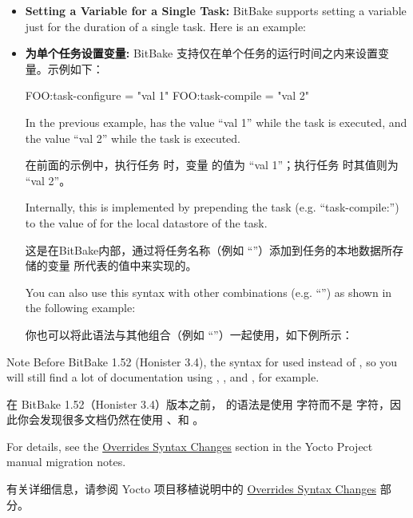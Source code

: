 \begin{itemize}
\item \textbf{Setting a Variable for a Single Task:} BitBake supports setting a variable just for the duration of a single task. Here is an example:
\item \textbf{为单个任务设置变量:} BitBake 支持仅在单个任务的运行时间之内来设置变量。示例如下：

\begin{pyglist}
FOO:task-configure = "val 1"
FOO:task-compile = "val 2"
\end{pyglist}

\medskip
In the previous example,  has the value ``val 1'' while the  task is executed, and the value ``val 2'' while the  task is executed.

\medskip
在前面的示例中，执行任务  时，变量  的值为 ``val 1''；执行任务  时其值则为 ``val 2''。

\medskip
Internally, this is implemented by prepending the task (e.g. ``task-compile:'') to the value of  for the local datastore of the  task.

\medskip
这是在BitBake内部，通过将任务名称（例如 ``''）添加到任务的本地数据所存储的变量  所代表的值中来实现的。

\medskip
You can also use this syntax with other combinations (e.g. ``'') as shown in the following example:

\medskip
你也可以将此语法与其他组合（例如 ``''）一起使用，如下例所示：

\medskip
{}

\end{itemize}

\begin{noteblock}{Note}%
Before BitBake 1.52 (Honister 3.4), the syntax for  used \code{_} instead of \code{:}, so you will still find a lot of documentation using , , and , for example.

\medskip
在 BitBake 1.52（Honister 3.4）版本之前，  的语法是使用 \code{_} 字符而不是 \code{:} 字符，因此你会发现很多文档仍然在使用 、和 。

\medskip
For details, see the \href{https://docs.yoctoproject.org/migration-guides/migration-3.4.html#override-syntax-changes}{Overrides Syntax Changes} section in the Yocto Project manual migration notes.

\medskip
有关详细信息，请参阅 Yocto 项目移植说明中的 \href{https://docs.yoctoproject.org/migration-guides/migration-3.4.html#override-syntax-changes}{Overrides Syntax Changes} 部分。

\end{noteblock}

